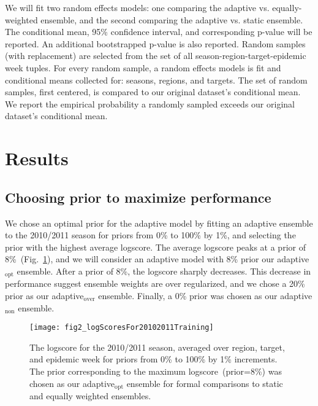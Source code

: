 \documentclass[12pt]{article}
\begin{document}
We will fit two random effects models: one comparing the adaptive vs. equally-weighted ensemble, and the second comparing the adaptive vs. static ensemble.
The conditional mean, 95\% confidence interval, and corresponding p-value will be reported.
An additional bootstrapped p-value is also reported.
Random samples (with replacement) are selected from the set of all season-region-target-epidemic week tuples.
For every random sample, a random effects models is fit and conditional means collected for: seasons, regions, and targets. 
The set of random samples, first centered, is compared to our original dataset's conditional mean.
We report the empirical probability a randomly sampled exceeds our original dataset's conditional mean.

\section{Results}

\subsection{Choosing prior to maximize performance}

We chose an optimal prior for the adaptive model by fitting an adaptive ensemble to the 2010/2011 season for priors from 0\% to 100\% by 1\%, and selecting the prior with the highest average logscore.
The average logscore peaks at a prior of 8\%~(Fig.~\ref{fig2.prespecifiedLogScorePlot}), and we will consider an adaptive model with 8\% prior our adaptive$_{\text{opt}}$ ensemble.
After a prior of 8\%, the logscore sharply decreases.
This decrease in performance suggest ensemble weights are over regularized, and we chose a 20\% prior as our adaptive$_{\text{over}}$ ensemble.
Finally, a 0\% prior was chosen as our adaptive$_{\text{non}}$ ensemble.

\graphicspath{{../_6_TLGs/_G/fig2_logScoresFor20102011Training/}}
\begin{figure}[ht!]
  \centering
  \texttt{[image: fig2\_logScoresFor20102011Training]}
  \caption{ The logscore for the 2010/2011 season, averaged over region, target, and epidemic week for priors from 0\% to 100\% by 1\% increments.
   The prior corresponding to the maximum logscore~(prior=8\%) was chosen as our adaptive$_{\text{opt}}$ ensemble for formal comparisons to static and equally weighted ensembles. \label{fig2.prespecifiedLogScorePlot}}
\end{figure}
\end{document}
